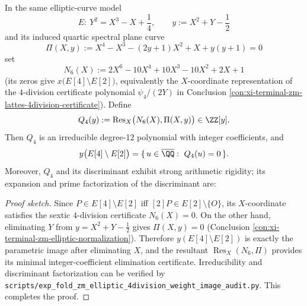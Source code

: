 
\begin{conclusion}\label{con:xi-terminal-zm-4division-weight-image}
In the same elliptic-curve model
\[
E:\ Y^{2}=X^{3}-X+\frac14,
\qquad
y:=X^{2}+Y-\frac12
\]
and its induced quartic spectral plane curve
\[
\Pi(X,y):=X^{4}-X^{3}-(2y+1)X^{2}+X+y(y+1)=0
\]
set
\[
N_{6}(X):=2X^{6}-10X^{4}+10X^{3}-10X^{2}+2X+1
\]
(its zeros give \(x\bigl(E[4]\setminus E[2]\bigr)\), equivalently the \(X\)-coordinate representation of the \(4\)-division certificate polynomial \(\psi_{4}/(2Y)\) in Conclusion \ref{con:xi-terminal-zm-lattes-4division-certificate}).
Define
\[
Q_{4}(y):=\operatorname{Res}_{X}\bigl(N_{6}(X),\Pi(X,y)\bigr)\in\ZZ[y].
\]
Then \(Q_{4}\) is an irreducible degree-12 polynomial with integer coefficients, and
\[
y\bigl(E[4]\setminus E[2]\bigr)=\{\,u\in\overline{\QQ}:\ Q_{4}(u)=0\,\}.
\]
Moreover, \(Q_{4}\) and its discriminant exhibit strong arithmetic rigidity; its expansion and prime factorization of the discriminant are:

\end{conclusion}
\begin{proof}[Proof sketch]
Since \(P\in E[4]\setminus E[2]\) iff \([2]P\in E[2]\setminus\{O\}\), its \(X\)-coordinate satisfies the sextic \(4\)-division certificate \(N_{6}(X)=0\).
On the other hand, eliminating \(Y\) from \(y=X^{2}+Y-\tfrac12\) gives \(\Pi(X,y)=0\) (Conclusion \ref{con:xi-terminal-zm-elliptic-normalization}).
Therefore \(y(E[4]\setminus E[2])\) is exactly the parametric image after eliminating \(X\), and the resultant \(\operatorname{Res}_{X}(N_{6},\Pi)\) provides its minimal integer-coefficient elimination certificate.
Irreducibility and discriminant factorization can be verified by \texttt{scripts/exp\_fold\_zm\_elliptic\_4division\_weight\_image\_audit.py}. This completes the proof.
\end{proof}

